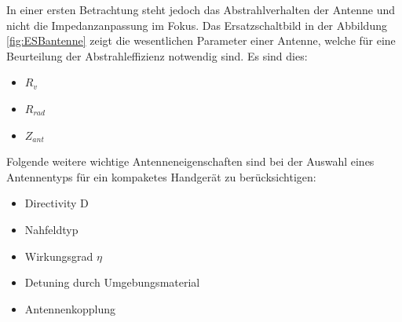 In einer ersten Betrachtung steht jedoch das Abstrahlverhalten der Antenne und nicht die Impedanzanpassung im Fokus. Das Ersatzschaltbild in der Abbildung \ref{fig:ESBantenne} zeigt die wesentlichen Parameter einer Antenne, welche für eine Beurteilung der Abstrahleffizienz notwendig sind. Es sind dies:
\begin{itemize}
\item $R_{v}$
\item $R_{rad}$
\item $Z_{ant}$
\end{itemize}
Folgende weitere wichtige Antenneneigenschaften sind bei der Auswahl eines Antennentyps für ein kompaketes Handgerät zu berücksichtigen:
\begin{itemize}
\item Directivity D
\item Nahfeldtyp
\item Wirkungsgrad $\eta$
\item Detuning durch Umgebungsmaterial
\item Antennenkopplung
\end{itemize}


